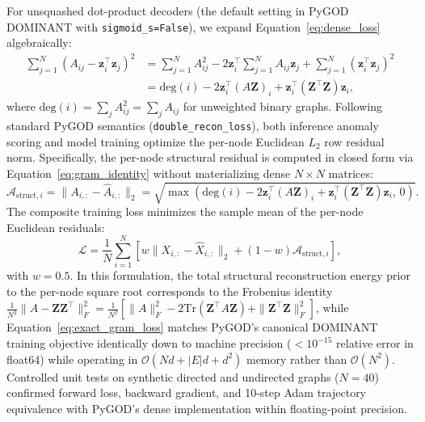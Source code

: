 \documentclass[applsci,article,submit,moreauthors,pdftex]{Definitions/mdpi}
\begin{document}
For unsquashed dot-product decoders (the default setting in PyGOD DOMINANT with \texttt{sigmoid\_s=False}), we expand Equation~\eqref{eq:dense_loss} algebraically:
\begin{align}
\sum_{j=1}^N \left(A_{ij} - \mathbf{z}_i^\top \mathbf{z}_j\right)^2 &= \sum_{j=1}^N A_{ij}^2 - 2 \mathbf{z}_i^\top \sum_{j=1}^N A_{ij} \mathbf{z}_j + \sum_{j=1}^N (\mathbf{z}_i^\top \mathbf{z}_j)^2 \nonumber \\
&= \mathrm{deg}(i) - 2 \mathbf{z}_i^\top \left(A \mathbf{Z}\right)_i + \mathbf{z}_i^\top \left(\mathbf{Z}^\top \mathbf{Z}\right) \mathbf{z}_i,
\label{eq:gram_identity}
\end{align}
where $\mathrm{deg}(i) = \sum_j A_{ij}^2 = \sum_j A_{ij}$ for unweighted binary graphs. Following standard PyGOD semantics (\texttt{double\_recon\_loss}), both inference anomaly scoring and model training optimize the per-node Euclidean $L_2$ row residual norm. Specifically, the per-node structural residual is computed in closed form via Equation~\eqref{eq:gram_identity} without materializing dense $N \times N$ matrices:
\begin{equation}
\mathcal{A}_{\mathrm{struct}, i} = \|A_{i,:} - \hat{A}_{i,:}\|_2 = \sqrt{\max\left(\mathrm{deg}(i) - 2 \mathbf{z}_i^\top (A \mathbf{Z})_i + \mathbf{z}_i^\top (\mathbf{Z}^\top \mathbf{Z}) \mathbf{z}_i, \, 0\right)}.
\label{eq:node_structural_score}
\end{equation}
The composite training loss minimizes the sample mean of the per-node Euclidean residuals:
\begin{equation}
\mathcal{L} = \frac{1}{N} \sum_{i=1}^N \left[ w \|X_{i,:} - \hat{X}_{i,:}\|_2 + (1 - w) \mathcal{A}_{\mathrm{struct}, i} \right],
\label{eq:exact_gram_loss}
\end{equation}
with $w=0.5$. In this formulation, the total structural reconstruction energy prior to the per-node square root corresponds to the Frobenius identity $\frac{1}{N^2}\|A - \mathbf{Z}\mathbf{Z}^\top\|_F^2 = \frac{1}{N^2} [\|A\|_F^2 - 2 \mathrm{Tr}(\mathbf{Z}^\top A \mathbf{Z}) + \|\mathbf{Z}^\top \mathbf{Z}\|_F^2]$, while Equation~\eqref{eq:exact_gram_loss} matches PyGOD's canonical DOMINANT training objective identically down to machine precision ($< 10^{-15}$ relative error in float64) while operating in $\mathcal{O}(N d + |E| d + d^2)$ memory rather than $\mathcal{O}(N^2)$. Controlled unit tests on synthetic directed and undirected graphs ($N=40$) confirmed forward loss, backward gradient, and 10-step Adam trajectory equivalence with PyGOD's dense implementation within floating-point precision.
\end{document}
